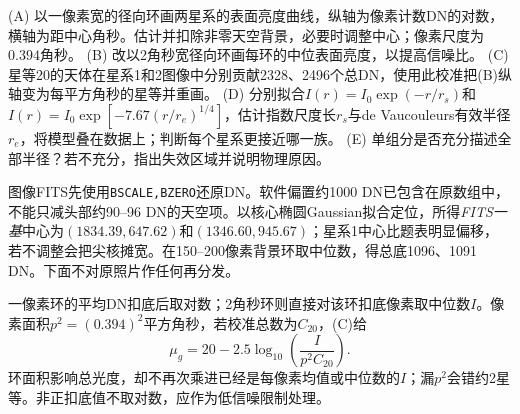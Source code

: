 \begin{exercise}
(A) 以一像素宽的径向环画两星系的表面亮度曲线，纵轴为像素计数DN的对数，横轴为距中心角秒。估计并扣除非零天空背景，必要时调整中心；像素尺度为$0.394$角秒。
(B) 改以2角秒宽径向环画每环的中位表面亮度，以提高信噪比。
(C) 星等20的天体在星系1和2图像中分别贡献2328、2496个总DN，使用此校准把(B)纵轴变为每平方角秒的星等并重画。
(D) 分别拟合$I(r)=I_0\exp(-r/r_s)$和$I(r)=I_0\exp[-7.67(r/r_e)^{1/4}]$，估计指数尺度长$r_s$与de Vaucouleurs有效半径$r_e$，将模型叠在数据上；判断每个星系更接近哪一族。
(E) 单组分是否充分描述全部半径？若不充分，指出失效区域并说明物理原因。
\end{exercise}
\begin{solution}
图像FITS先使用\texttt{BSCALE,BZERO}还原DN。软件偏置约1000 DN已包含在原数组中，不能只减头部约90--96 DN的天空项。以核心椭圆Gaussian拟合定位，所得\emph{FITS一基}中心为$(1834.39,647.62)$和$(1346.60,945.67)$；星系1中心比题表明显偏移，若不调整会把尖核摊宽。在150--200像素背景环取中位数，得总底1096、1091 DN。下面不对原照片作任何再分发。

一像素环的平均DN扣底后取对数；2角秒环则直接对该环扣底像素取中位数$I$。像素面积$p^2=(0.394)^2$平方角秒，若校准总数为$C_{20}$，(C)给
\[
 \mu_g=20-2.5\log_{10}\left(\frac{I}{p^2C_{20}}\right).
\]
环面积影响总光度，却不再次乘进已经是每像素均值或中位数的$I$；漏$p^2$会错约2星等。非正扣底值不取对数，应作为低信噪限制处理。
\begin{center}\end{center}


\end{solution}

